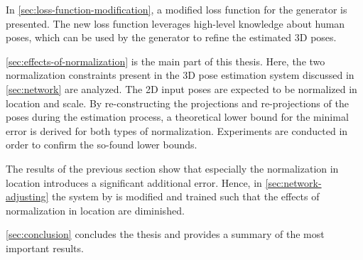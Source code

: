 In \autoref{sec:loss-function-modification}, a modified loss function for the generator is presented.
The new loss function leverages high-level knowledge about human poses, which can be used by the generator to refine the estimated 3D poses.

\autoref{sec:effects-of-normalization} is the main part of this thesis.
Here, the two normalization constraints present in the 3D pose estimation system discussed in \autoref{sec:network} are analyzed.
The 2D input poses are expected to be normalized in location and scale.
By re-constructing the projections and re-projections of the poses during the estimation process, a theoretical lower bound for the minimal error is derived for both types of normalization.
Experiments are conducted in order to confirm the so-found lower bounds.

The results of the previous section show that especially the normalization in location introduces a significant additional error.
Hence, in \autoref{sec:network-adjusting} the system by \citet{drover18} is modified and trained such that the effects of normalization in location are diminished.

\autoref{sec:conclusion} concludes the thesis and provides a summary of the most important results.